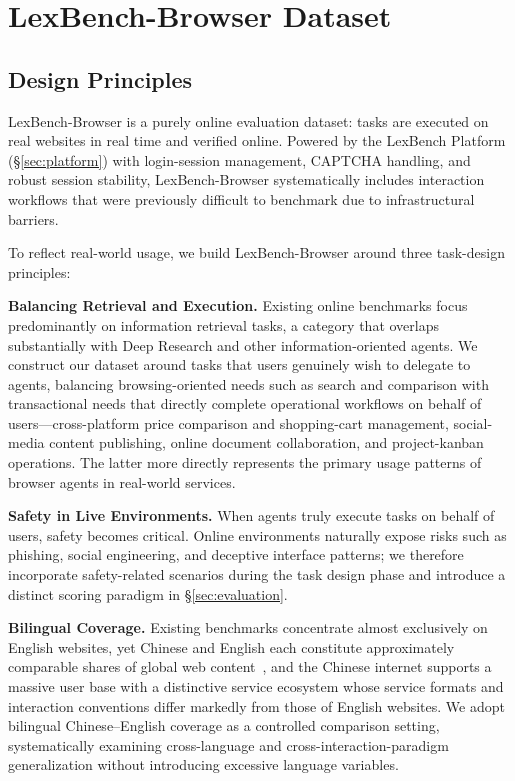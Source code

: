 \section{LexBench-Browser Dataset}
\label{sec:dataset}

\subsection{Design Principles}

LexBench-Browser is a purely online evaluation dataset: tasks are executed on real websites in real time and verified online. Powered by the LexBench Platform (\S\ref{sec:platform}) with login-session management, CAPTCHA handling, and robust session stability, LexBench-Browser systematically includes interaction workflows that were previously difficult to benchmark due to infrastructural barriers.

To reflect real-world usage, we build LexBench-Browser around three task-design principles:

\textbf{Balancing Retrieval and Execution.} Existing online benchmarks focus predominantly on information retrieval tasks, a category that overlaps substantially with Deep Research and other information-oriented agents. We construct our dataset around tasks that users genuinely wish to delegate to agents, balancing browsing-oriented needs such as search and comparison with transactional needs that directly complete operational workflows on behalf of users---cross-platform price comparison and shopping-cart management, social-media content publishing, online document collaboration, and project-kanban operations. The latter more directly represents the primary usage patterns of browser agents in real-world services.

\textbf{Safety in Live Environments.} When agents truly execute tasks on behalf of users, safety becomes critical. Online environments naturally expose risks such as phishing, social engineering, and deceptive interface patterns; we therefore incorporate safety-related scenarios during the task design phase and introduce a distinct scoring paradigm in \S\ref{sec:evaluation}.

\textbf{Bilingual Coverage.} Existing benchmarks concentrate almost exclusively on English websites, yet Chinese and English each constitute approximately comparable shares of global web content~\cite{chinese_english_web}, and the Chinese internet supports a massive user base with a distinctive service ecosystem whose service formats and interaction conventions differ markedly from those of English websites. We adopt bilingual Chinese--English coverage as a controlled comparison setting, systematically examining cross-language and cross-interaction-paradigm generalization without introducing excessive language variables.

